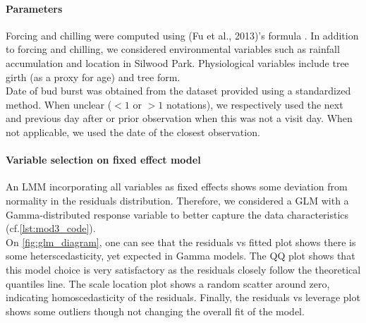\documentclass{article}
\begin{document}
\paragraph{Parameters}
Forcing and chilling were computed using (Fu et al., 2013)'s formula \cite{Fu_2013}. In addition to forcing and chilling, we considered environmental variables such as rainfall accumulation and location in Silwood Park. Physiological variables include tree girth (as a proxy for age) and tree form.\\
Date of bud burst was obtained from the dataset provided using a standardized method. When unclear ($<1$ or $>1$ notations), we respectively used the next and previous day after or prior observation when this was not a visit day. When not applicable, we used the date of the closest observation. 

\paragraph{Variable selection on fixed effect model}
An LMM incorporating all variables as fixed effects shows some deviation from normality in the residuals distribution. Therefore, we considered a GLM with a Gamma-distributed response variable to better capture the data characteristics (cf.\autoref{lst:mod3_code}). \\
On \autoref{fig:glm_diagram}, one can see that the residuals vs fitted plot shows there is some heterscedasticity, yet expected in Gamma models. The QQ plot shows that this model choice is very satisfactory as the residuals closely follow the theoretical quantiles line. The scale location plot shows a random scatter around zero, indicating homoscedasticity of the residuals. Finally, the residuals vs leverage plot shows some outliers though not changing the overall fit of the model. 
\end{document}
